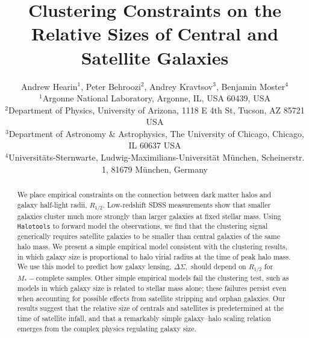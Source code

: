\documentclass[usenatbib,usegraphicx,letterpaper]{mn2e}
\newcommand{\rhalf}{R_{1/2}}
\newcommand{\mstar}{M_{\ast}}
\begin{document}
\title[The Relative Sizes of Centrals and Satellites]
{Clustering Constraints on the Relative Sizes of Central and Satellite Galaxies}


\author[Hearin, Behroozi, Kravtsov \& Moster]{
Andrew Hearin$^{1}$, Peter Behroozi$^{2}$, Andrey Kravtsov$^{3}$, Benjamin Moster$^{4}$\\
$^{1}$Argonne National Laboratory, Argonne, IL, USA 60439, USA\\
$^{2}$Department of Physics, University of Arizona, 1118 E 4th St, Tucson, AZ 85721 USA\\
$^{3}$Department of Astronomy \& Astrophysics, The University of Chicago, Chicago, IL 60637 USA\\
$^{4}$Universit{\"a}ts-Sternwarte, Ludwig-Maximilians-Universit{\"a}t M{\"u}nchen, Scheinerstr. 1, 81679 M{\"u}nchen, Germany
}

\maketitle

\begin{abstract}
We place empirical constraints on the connection between dark matter halos and galaxy half-light radii, $\rhalf.$ Low-redshift SDSS measurements show that smaller galaxies cluster much more strongly than larger galaxies at fixed stellar mass. Using {\tt Halotools} to forward model the observations, we find that the clustering signal generically requires satellite galaxies to be smaller than central galaxies of the same halo mass. We present a simple empirical model consistent with the clustering results, in which galaxy size is proportional to halo virial radius at the time of peak halo mass. We use this model to predict how galaxy lensing, $\Delta\Sigma,$ should depend on $\rhalf$ for $\mstar-$complete samples. Other simple empirical models fail the clustering test, such as models in which galaxy size is related to stellar mass alone; these failures persist even when accounting for possible effects from satellite stripping and orphan galaxies. Our results suggest that the relative size of centrals and satellites is predetermined at the time of satellite infall, and that a remarkably simple galaxy--halo scaling relation emerges from the complex physics regulating galaxy size. 
\end{abstract}
\end{document}
